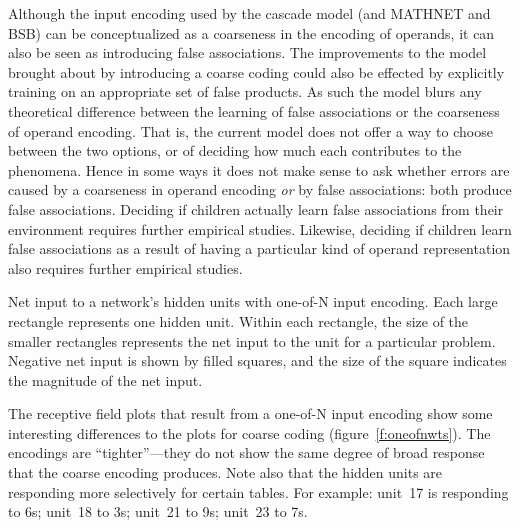 Although the input encoding used by the cascade model (and MATHNET and BSB)
can be conceptualized as a coarseness in the encoding of operands, it can
also be seen as introducing false associations.  The improvements to the
model brought about by introducing a coarse coding could also be effected
by explicitly training on an appropriate set of false products. As such the
model blurs any theoretical difference between the learning of false
associations or the coarseness of operand encoding.  That is, the current
model does not offer a way to choose between the two options, or of
deciding how much each contributes to the phenomena.  Hence in some ways
it does not make sense to ask whether errors are caused by a coarseness in
operand encoding {\em or} by false associations: both produce
false associations.  Deciding if children actually learn false associations
from their environment requires further empirical studies. Likewise,
deciding if children learn false associations as a result of having a
particular kind of operand representation also requires further empirical
studies.

%
%

\begin{fancyfigure}
\centerline{}
\caption{Net input to a network's hidden units with one-of-N input
encoding.
Each large rectangle
represents one hidden unit.  Within each rectangle, the size of the smaller
rectangles represents the net input to the unit for a particular problem.
Negative net input is shown by filled squares, and the size of the square
indicates the magnitude of the net input.}
\label{f:oneofnwts}
\end{fancyfigure}

The receptive field plots that result from a one-of-N input encoding show
some interesting differences to the plots for coarse coding
(figure~\ref{f:oneofnwts}). The encodings
are ``tighter''---they do not show the same degree of broad response that
the coarse encoding produces.  Note also that the hidden units are
responding more selectively for certain tables.  For example: unit~17 is
responding to 6s; unit~18 to 3s; unit~21 to 9s; unit~23 to 7s.

